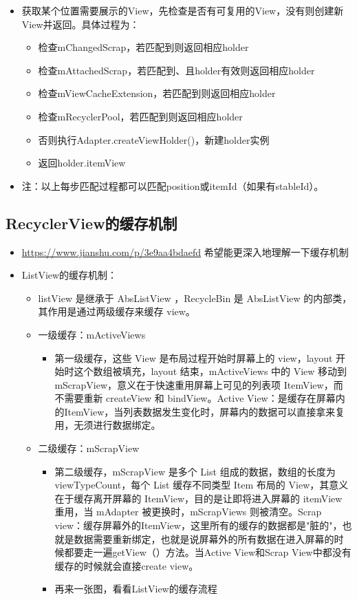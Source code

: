\documentclass[9pt, b5paper]{article}
\begin{document}
\begin{itemize}
\item 获取某个位置需要展示的View，先检查是否有可复用的View，没有则创建新View并返回。具体过程为：
\begin{itemize}
\item 检查mChangedScrap，若匹配到则返回相应holder
\item 检查mAttachedScrap，若匹配到、且holder有效则返回相应holder
\item 检查mViewCacheExtension，若匹配到则返回相应holder
\item 检查mRecyclerPool，若匹配到则返回相应holder
\item 否则执行Adapter.createViewHolder()，新建holder实例
\item 返回holder.itemView
\end{itemize}
\item 注：以上每步匹配过程都可以匹配position或itemId（如果有stableId）。
\end{itemize}

\subsection{RecyclerView的缓存机制}
\label{sec-5-4}
\begin{itemize}
\item \url{https://www.jianshu.com/p/3e9aa4bdaefd} 希望能更深入地理解一下缓存机制
\item ListView的缓存机制：
\begin{itemize}
\item listView 是继承于 AbsListView ，RecycleBin 是 AbsListView 的内部类，其作用是通过两级缓存来缓存 view。
\item 一级缓存：mActiveViews
\begin{itemize}
\item 第一级缓存，这些 View 是布局过程开始时屏幕上的 view，layout 开始时这个数组被填充，layout 结束，mActiveViews 中的 View 移动到 mScrapView，意义在于快速重用屏幕上可见的列表项 ItemView，而不需要重新 createView 和 bindView。Active View：是缓存在屏幕内的ItemView，当列表数据发生变化时，屏幕内的数据可以直接拿来复用，无须进行数据绑定。
\end{itemize}
\item 二级缓存：mScrapView
\begin{itemize}
\item 第二级缓存，mScrapView 是多个 List 组成的数据，数组的长度为 viewTypeCount，每个 List 缓存不同类型 Item 布局的 View，其意义在于缓存离开屏幕的 ItemView，目的是让即将进入屏幕的 itemView 重用，当 mAdapter 被更换时，mScrapViews 则被清空。Scrap view：缓存屏幕外的ItemView，这里所有的缓存的数据都是"脏的"，也就是数据需要重新绑定，也就是说屏幕外的所有数据在进入屏幕的时候都要走一遍getView（）方法。当Active View和Scrap View中都没有缓存的时候就会直接create view。
\item 再来一张图，看看ListView的缓存流程
\end{itemize}
\end{itemize}
\end{itemize}
\end{document}
